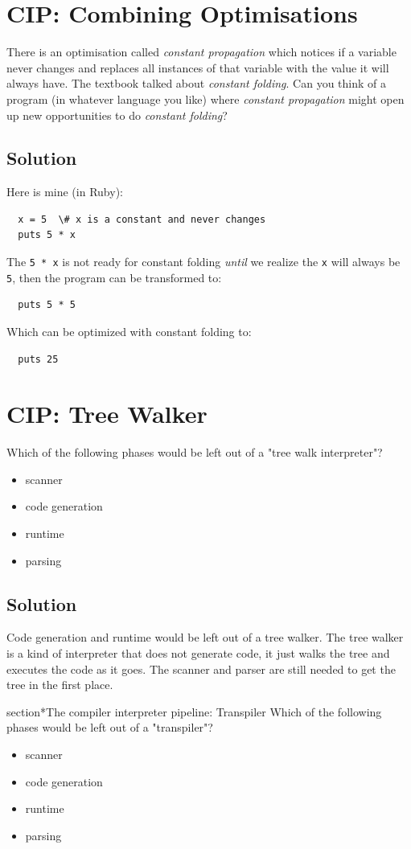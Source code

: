 \documentclass[twoside=false, DIV=14]{scrartcl}
\begin{document}
\section*{CIP: Combining Optimisations}
  There is an optimisation called \emph{constant propagation} which notices if a variable never changes and replaces all instances of that variable with the value it will always have. The textbook talked about \emph{constant folding}. Can you think of a program (in whatever language you like) where \emph{constant propagation} might open up new opportunities to do \emph{constant folding}?
\subsection*{Solution}
  Here is mine (in Ruby):
  \begin{verbatim}
  x = 5  \# x is a constant and never changes
  puts 5 * x
  \end{verbatim}
  The \texttt{5 * x} is not ready for constant folding \emph{until} we realize the \texttt{x} will always be \texttt{5}, then the program can be transformed to:
  \begin{verbatim}
  puts 5 * 5
  \end{verbatim}
  Which can be optimized with constant folding to:
  \begin{verbatim}
  puts 25
  \end{verbatim}

\section*{CIP: Tree Walker}
Which of the following phases would be left out of a "tree walk interpreter"?
\begin{itemize}
    \item scanner
    \item code generation
    \item runtime
    \item parsing
\end{itemize}
\subsection*{Solution}
Code generation and runtime would be left out of a tree walker.  The tree walker is a kind of interpreter that does not generate code, it just walks the tree and executes the code as it goes.  The scanner and parser are still needed to get the tree in the first place.

section*{The compiler interpreter pipeline: Transpiler}
Which of the following phases would be left out of a "transpiler"?
\begin{itemize}
    \item scanner
    \item code generation
    \item runtime
    \item parsing
\end{itemize}
\end{document}
